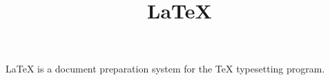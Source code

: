 \documentclass{article}
\title{\LaTeX}
\begin{document}
  \maketitle
  \LaTeX{} is a document preparation system for
  the \TeX{} typesetting program.
\end{document}
